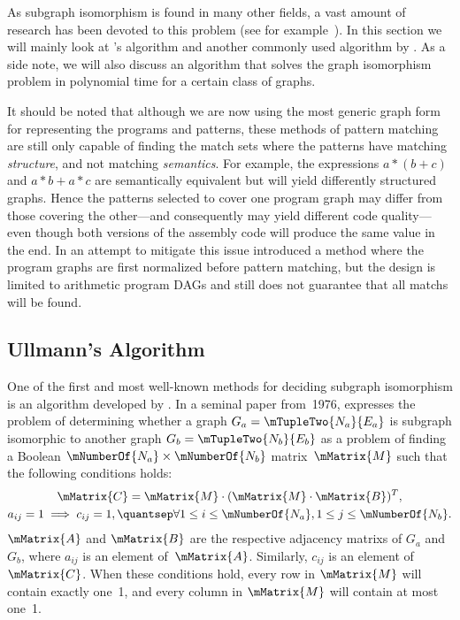 As \gls{subgraph isomorphism} is found in many other fields, a vast amount of
research has been devoted to this problem (see for
example~).
%
In this section we
will mainly look at \citeauthor{Ullmann1976}'s algorithm and another commonly
used algorithm by \citeauthor{Cordella2001}.
%
As a side note, we will also
discuss an algorithm that solves the \gls{graph isomorphism} problem in
polynomial time for a certain class of \glspl{graph}.

It should be noted that although we are now using the most generic \gls{graph}
form for representing the \glspl{program} and \glspl{pattern}, these methods of
\gls{pattern matching} are still only capable of finding the \glspl{match set}
where the \glspl{pattern} have matching \emph{structure}, and not matching
\emph{semantics}.
%
For example, the expressions \mbox{$a * (b + c)$} and \mbox{$a
  * b + a * c$} are semantically equivalent but will yield differently
structured \glspl{graph}.
%
Hence the \glspl{pattern} selected to cover one
\gls{program graph} may differ from those covering the other---and consequently
may yield different code quality---even though both versions of the
\gls{assembly code} will produce the same value in the end.
%
In an attempt to
mitigate this issue \textcite{Arora2010} introduced a method where the
\glspl{program graph} are first normalized before \gls{pattern matching}, but
the design is limited to arithmetic \glspl{program DAG} and still does not
guarantee that all \glspl{match} will be found.


\subsection{Ullmann's Algorithm}

One of the first and most well-known methods for deciding \gls{subgraph
  isomorphism} is an algorithm developed by \textcite{Ullmann1976}.
%
In a seminal
paper from~1976, \citeauthor{Ullmann1976} expresses the problem of determining
whether a \gls{graph} \mbox{$G_a = \mTupleTwo{N_a}{E_a}$} is \gls{subgraph}
\gls{isomorphic} to another \gls{graph} \mbox{$G_b = \mTupleTwo{N_b}{E_b}$} as a
problem of finding a Boolean \mbox{$\mNumberOf{N_a} \times \mNumberOf{N_b}$}
matrix~$\mMatrix{M}$ such that the following conditions holds:
\begin{gather*}
  \mMatrix{C} = \mMatrix{M} \cdot (\mMatrix{M} \cdot \mMatrix{B})^T,\\
  a_{ij} = 1 \implies c_{ij} = 1,
  \quantsep
  \forall 1 \leq i \leq \mNumberOf{N_a}, 1 \leq j \leq \mNumberOf{N_b}.
\end{gather*}
$\mMatrix{A}$ and $\mMatrix{B}$ are the respective \glspl{adjacency matrix} of
$G_a$ and~$G_b$, where $a_{ij}$ is an element of~$\mMatrix{A}$.
%
Similarly,
$c_{ij}$ is an element of~$\mMatrix{C}$.
%
When these conditions hold, every row
in $\mMatrix{M}$ will contain exactly one~1, and every column in $\mMatrix{M}$
will contain at most one~1.

